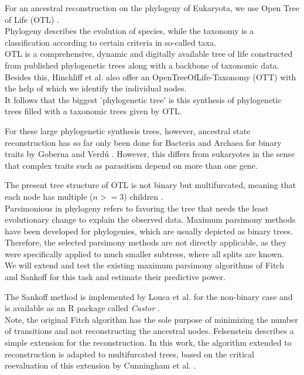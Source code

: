   For an ancestral reconstruction on the phylogeny of Eukaryota, we use Open Tree of Life (OTL) 
    \cite{Hinchliff2015}. \\
  Phylogeny describes the evolution of species, while the taxonomy is a classification according to 
    certain criteria in so-called taxa. \\
  OTL is a comprehensive, dynamic and digitally available tree of life constructed from published 
    phylogenetic trees along with a backbone of taxonomic data. Besides this, Hinchliff et al. also 
    offer an OpenTreeOfLife-Taxonomy (OTT) with the help of which we identify the individual nodes. \\
  It follows that the biggest 'phylogenetic tree' is this synthesis of phylogenetic trees filled 
    with a taxonomic trees given by OTL.

  For these large phylogenetic synthesis trees, however, ancestral state reconstruction has so far 
    only been done for Bacteria and Archaea for binary traits by Goberna and Verdú \cite{Goberna2015}.
    However, this differs from eukaryotes in the sense that complex traits such as parasitism depend
    on more than one gene.

  The present tree structure of OTL is not binary but multifurcated, meaning that each node has
    multiple ($n >= 3$) children \cite{Felsenstein2003}. \\
  Parsimonious in phylogeny refers to favoring the tree that needs the least evolutionary change to 
    explain the observed data. Maximum parsimony methods have been developed for phylogenies, which 
    are usually depicted as binary trees. Therefore, the selected parsimony methods are not directly 
    applicable, as they were specifically applied to much smaller subtrees, where all splits are 
    known. \\
  We will extend and test the existing maximum parsimony algorithms of Fitch \cite{Fitch1971} and 
    Sankoff \cite{Sankoff1975} for this task and estimate their predictive power. 

  The Sankoff method is implemented by Louca et al. for the non-binary case and is available as an R 
    package called \textit{Castor} \cite{Louca2017}. \\
  Note, the original Fitch algorithm has the sole purpose of minimizing the number of transitions 
    and not reconstructing the ancestral nodes. Felsenstein \cite{Felsenstein2003} describes a 
    simple extension for the reconstruction. In this work, the algorithm extended to reconstruction 
    is adapted to multifurcated trees, based on the critical reevaluation of this extension by 
    Cunningham et al. \cite{Cunningham1998}.  

